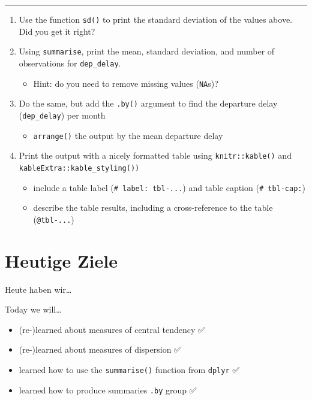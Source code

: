 \documentclass[
  letterpaper,
  DIV=11]{scrartcl}
\providecommand{\tightlist}{%
  \setlength{\itemsep}{0pt}\setlength{\parskip}{0pt}}\usepackage{longtable,booktabs,array}
\begin{document}
\begin{center}\rule{0.5\linewidth}{0.5pt}\end{center}

\begin{enumerate}
\def\labelenumi{\arabic{enumi}.}
\setcounter{enumi}{1}
\tightlist
\item
  Use the function \texttt{sd()} to print the standard deviation of the
  values above. Did you get it right?
\item
  Using \texttt{summarise}, print the mean, standard deviation, and
  number of observations for \texttt{dep\_delay}.

  \begin{itemize}
  \tightlist
  \item
    Hint: do you need to remove missing values (\texttt{NA}s)?
  \end{itemize}
\item
  Do the same, but add the \texttt{.by()} argument to find the departure
  delay (\texttt{dep\_delay}) per month

  \begin{itemize}
  \tightlist
  \item
    \texttt{arrange()} the output by the mean departure delay
  \end{itemize}
\item
  Print the output with a nicely formatted table using
  \texttt{knitr::kable()} and \texttt{kableExtra::kable\_styling())}

  \begin{itemize}
  \tightlist
  \item
    include a table label (\texttt{\#\textbar{}\ label:\ tbl-...}) and
    table caption (\texttt{\#\textbar{}\ tbl-cap:})
  \item
    describe the table results, including a cross-reference to the table
    (\texttt{@tbl-...})
  \end{itemize}
\end{enumerate}

\hypertarget{heutige-ziele-1}{%
\section*{Heutige Ziele 🏁}\label{heutige-ziele-1}}

Heute haben wir\ldots{}

Today we will\ldots{}

\begin{itemize}
\tightlist
\item
  (re-)learned about measures of central tendency ✅
\item
  (re-)learned about measures of dispersion ✅
\item
  learned how to use the \texttt{summarise()} function from
  \texttt{dplyr} ✅
\item
  learned how to produce summaries \texttt{.by} group ✅
\end{itemize}
\end{document}
